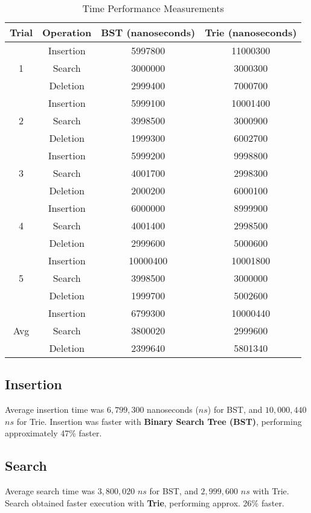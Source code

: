 \documentclass{article}
\begin{document}
\begin{table}[h]
\centering
    \caption{Time Performance Measurements}
    \captionsetup{skip=15pt} %
\begin{tabular}{|c|c|c|c|}
\hline
\textbf{Trial} & \textbf{Operation} & \textbf{BST (nanoseconds)} & \textbf{Trie (nanoseconds)} \\
\hline
 & Insertion & 5997800 & 11000300 \\
1 & Search & 3000000 & 3000300 \\
 & Deletion & 2999400 & 7000700 \\
\hline
 & Insertion & 5999100 & 10001400 \\
2 & Search & 3998500 & 3000900 \\
 & Deletion & 1999300 & 6002700 \\
\hline
 & Insertion & 5999200 & 9998800 \\
3 & Search & 4001700 & 2998300 \\
 & Deletion & 2000200 & 6000100 \\
\hline
 & Insertion & 6000000 & 8999900 \\
4 & Search & 4001400 & 2998500 \\
 & Deletion & 2999600 & 5000600 \\
\hline
 & Insertion & 10000400 & 10001800 \\
5 & Search & 3998500 & 3000000 \\
 & Deletion & 1999700 & 5002600 \\
\hline
 & Insertion & 6799300 & 10000440 \\
Avg & Search & 3800020 & 2999600 \\
 & Deletion & 2399640 & 5801340 \\
\hline
\end{tabular}
\end{table}


\subsection{Insertion}
Average insertion time was $6,799,300$ nanoseconds ($ns$) for BST, and $10,000,440$ $ns$ for Trie. Insertion was faster with \textbf{Binary Search Tree (BST)}, performing approximately 47\% faster. 

\subsection{Search}
Average search time was $3,800,020$ $ns$ for BST, and $2,999,600$ $ns$ with Trie. Search obtained faster execution with \textbf{Trie}, performing approx. 26\% faster.
\end{document}
